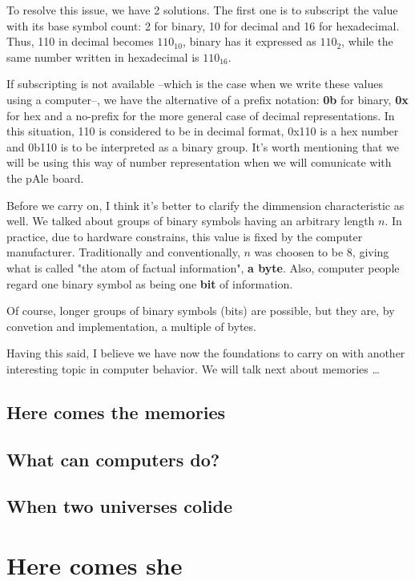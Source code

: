 \documentclass[12pt, a4paper]{book}
\begin{document}
To resolve this issue, we have 2 solutions. The first one is to subscript the value with its base symbol count: 2 for binary, 10 for decimal and 16 for hexadecimal. Thus, 110 in decimal becomes $110_{10}$, binary has it expressed as $110_2$, while the same number written in hexadecimal is $110_{16}$.

If subscripting is not available --which is the case when we write these values using a computer--, we have the alternative of a prefix notation: \textbf{0b} for binary, \textbf{0x} for hex and a no-prefix for the more general case of decimal representations. In this situation, 110 is considered to be in decimal format, 0x110 is a hex number and 0b110 is to be interpreted as a binary group. It's worth mentioning that we will be using this way of number representation when we will comunicate with the pAle board.

Before we carry on, I think it's better to clarify the dimmension characteristic as well. We talked about groups of binary symbols having an arbitrary length $n$. In practice, due to hardware constrains, this value is fixed by the computer manufacturer. Traditionally and conventionally, $n$ was choosen to be 8, giving what is called "the atom of factual information", \textbf{a byte}. Also, computer people regard one binary symbol as being one \textbf{bit} of information.

Of course, longer groups of binary symbols (bits) are possible, but they are, by convetion and implementation, a multiple of bytes.

Having this said, I believe we have now the foundations to carry on with another interesting topic in computer behavior. We will talk next about memories \ldots

\section{Here comes the memories}


\section{What can computers do?}
\section{When two universes colide}
\chapter{Here comes she}
\end{document}
